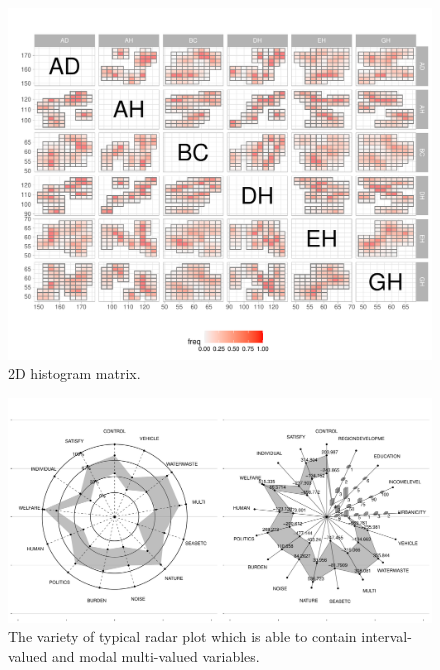 \documentclass[article]{jss}
\begin{document}
\begin{appendix}
\begin{figure}[t!]
\centering
\includegraphics[width=1\textwidth]{pic/2DhistMatrix}
\caption{\label{fig:2DhistMatrix} 2D histogram matrix.}
\end{figure}



\begin{figure}[t!]
\centering
\includegraphics[width=1\textwidth]{pic/radar_typical} 
\caption{\label{fig:radar_typical} The variety of typical radar plot which is able to contain interval-valued and modal multi-valued variables.}
\end{figure}




\end{appendix}
\end{document}

